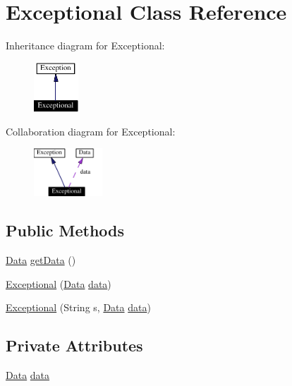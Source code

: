 \hypertarget{classExceptional}{
\section{Exceptional  Class Reference}
\label{classExceptional}
}
Inheritance diagram for Exceptional:\begin{figure}[H]
\begin{center}
\leavevmode
\includegraphics[width=47pt]{classExceptional__inherit__graph}
\end{center}
\end{figure}
Collaboration diagram for Exceptional:\begin{figure}[H]
\begin{center}
\leavevmode
\includegraphics[width=73pt]{classExceptional__coll__graph}
\end{center}
\end{figure}
\subsection*{Public Methods}
\begin{CompactItemize}
\item 
\hyperlink{interfaceData}{Data} \hyperlink{classExceptional_a0}{get\-Data} ()
\item 
\hyperlink{classExceptional_a1}{Exceptional} (\hyperlink{interfaceData}{Data} \hyperlink{classExceptional_o0}{data})
\item 
\hyperlink{classExceptional_a2}{Exceptional} (String s, \hyperlink{interfaceData}{Data} \hyperlink{classExceptional_o0}{data})
\end{CompactItemize}
\subsection*{Private Attributes}
\begin{CompactItemize}
\item 
\hyperlink{interfaceData}{Data} \hyperlink{classExceptional_o0}{data}
\end{CompactItemize}


